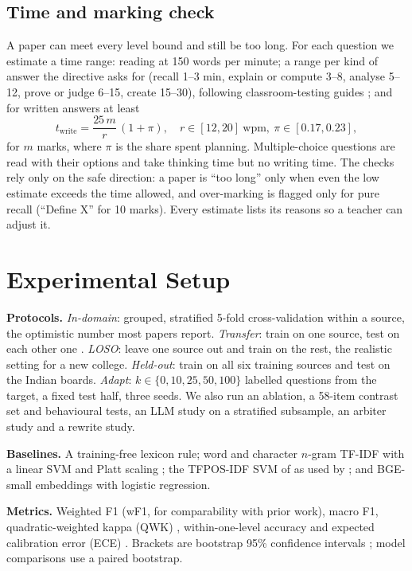 \documentclass[conference]{IEEEtran}
\begin{document}
\subsection{Time and marking check}
A paper can meet every level bound and still be too long. For each question we estimate a time
range: reading at 150 words per minute; a range per kind of answer the directive asks for (recall
1--3 min, explain or compute 3--8, analyse 5--12, prove or judge 6--15, create 15--30), following
classroom-testing guides \cite{nitko2001}; and for written answers at least
\begin{equation}
t_{\mathrm{write}} = \frac{25\,m}{r}\,(1+\pi),\quad r\in[12,20]\ \text{wpm},\ \pi\in[0.17,0.23],
\end{equation}
for $m$ marks, where $\pi$ is the share spent planning. Multiple-choice questions are read with
their options and take thinking time but no writing time. The checks rely only on the safe
direction: a paper is ``too long'' only when even the low estimate exceeds the time allowed, and
over-marking is flagged only for pure recall (``Define X'' for 10 marks). Every estimate lists its
reasons so a teacher can adjust it.

\section{Experimental Setup}

\textbf{Protocols.} \emph{In-domain}: grouped, stratified 5-fold cross-validation within a source,
the optimistic number most papers report. \emph{Transfer}: train on one source, test on each
other one \cite{faraji2026}. \emph{LOSO}: leave one source out and train on the rest, the realistic
setting for a new college. \emph{Held-out}: train on all six training sources and test on the
Indian boards. \emph{Adapt}: $k\in\{0,10,25,50,100\}$ labelled questions from the target, a fixed
test half, three seeds. We also run an ablation, a 58-item contrast set and behavioural tests,
an LLM study on a stratified subsample, an arbiter study and a rewrite study.

\textbf{Baselines.} A training-free lexicon rule; word and character $n$-gram TF-IDF with a linear
SVM and Platt scaling \cite{platt1999}; the TFPOS-IDF SVM of \cite{mohammed2020} as used by
\cite{faraji2026}; and BGE-small embeddings with logistic regression.

\textbf{Metrics.} Weighted F1 (wF1, for comparability with prior work), macro F1,
quadratic-weighted kappa (QWK) \cite{cohen1968}, within-one-level accuracy and expected
calibration error (ECE) \cite{guo2017}. Brackets are bootstrap 95\% confidence intervals
\cite{efron1993}; model comparisons use a paired bootstrap.
\end{document}
